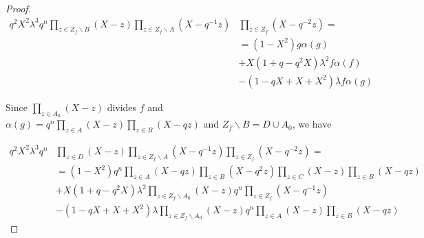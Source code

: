 \documentclass[a4paper, 11pt]{article}
\theoremstyle{definition}
\begin{document}
\begin{proof}
\begin{equation}\label{niewieder1}
\begin{split}
q^2X^2\lambda^3 q^n\prod_{z\in Z_f\backslash B}(X-z) \prod_{z\in Z_f\backslash A}(X-q^{-1}z) &\prod_{z\in Z_f}(X-q^{-2}z)= \\ &=(1-X^2)g\alpha(g)\\
&+ X(1+q-q^2X)\lambda^2f\alpha(f)\\
&-(1-qX+X+X^2)\lambda f\alpha(g)
\end{split}
\end{equation}

Since $\prod_{z\in A_0}(X-z)$ divides $f$ and $\alpha(g)=q^n\prod_{z\in A}(X-z)\prod_{z\in B}(X-qz)$ and $Z_f\backslash B=D\cup A_0$, we have

\begin{equation}\label{niewieder2}
\begin{split}
q^2X^2\lambda^3 q^n&\prod_{z\in D}(X-z) \prod_{z\in Z_f\backslash A}(X-q^{-1}z) \prod_{z\in Z_f}(X-q^{-2}z)= \\ &=(1-X^2)q^n\prod_{z\in A}(X-qz)\prod_{z\in B}(X-q^2z)\prod_{z\in C}(X-z)\prod_{z\in B}(X-qz)\\
&+ X(1+q-q^2X)\lambda^2\prod_{z\in Z_f\backslash A_0}(X-z)q^n\prod_{z\in Z_f}(X-q^{-1}z)\\
&-(1-qX+X+X^2)\lambda \prod_{z\in Z_f\backslash A_0}(X-z)q^n\prod_{z\in A}(X-z)\prod_{z\in B}(X-qz)
\end{split}
\end{equation}


\end{proof}
\end{document}
